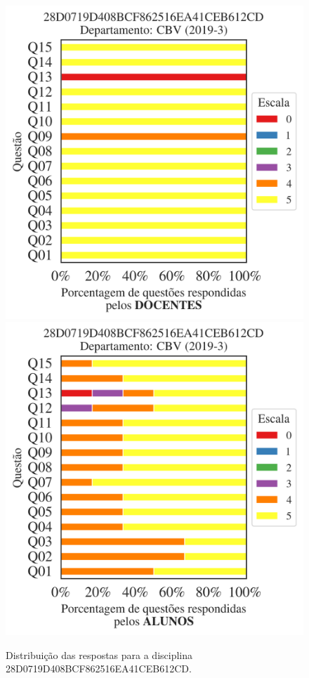 \documentclass[a4paper,10pt]{article}
\begin{document}
\begin{figure}[h]
\centering
\includegraphics[width=0.485\linewidth]{analise_disciplina_departamento_CBV_28D0719D408BCF862516EA41CEB612CD_docentes.png}
\includegraphics[width=0.485\linewidth]{analise_disciplina_departamento_CBV_28D0719D408BCF862516EA41CEB612CD_alunos.png}
\caption{\label{fig:analise_geral_departamento}                Distribuição das respostas para a disciplina 28D0719D408BCF862516EA41CEB612CD. }
\end{figure}
\end{document}
